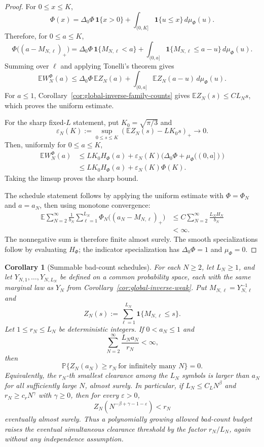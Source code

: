 \documentclass[11pt]{amsart}
\numberwithin{equation}{section}
\newtheorem{corollary}[theorem]{Corollary}
\theoremstyle{definition}
\theoremstyle{remark}
\newcommand{\Prob}{\mathbb P}
\newcommand{\Exp}{\mathbb E}
\newcommand{\eps}{\varepsilon}
\begin{document}
\begin{proof}
For \(0\le x\le K\),
\[
  \Phi(x)=\Delta_0\Phi\,\mathbf1\{x>0\}
  +\int_{(0,K]}\mathbf1\{u\le x\}\,d\mu_\Phi(u).
\]
Therefore, for \(0\le a\le K\),
\[
  \Phi\bigl((a-M_{N,\ell})_+\bigr)
  =
  \Delta_0\Phi\,\mathbf1\{M_{N,\ell}<a\}
  +\int_{(0,a]}\mathbf1\{M_{N,\ell}\le a-u\}\,d\mu_\Phi(u).
\]
Summing over \(\ell\) and applying Tonelli's theorem gives
\[
  \Exp W_N^\Phi(a)
  \le
  \Delta_0\Phi\,\Exp Z_N(a)+
  \int_{(0,a]}\Exp Z_N(a-u)\,d\mu_\Phi(u).
\]
For \(a\le1\), Corollary~\ref{cor:global-inverse-family-counts} gives
\(\Exp Z_N(s)\le CL_Ns\), which proves the uniform estimate.

For the sharp fixed-\(L\) statement, put \(K_0=\sqrt{\pi/3}\) and
\[
  \varepsilon_N(K):=
  \sup_{0\le s\le K}
  \left(\Exp Z_N(s)-LK_0s\right)_+
  \longrightarrow0 .
\]
Then, uniformly for \(0\le a\le K\),
\[
\begin{aligned}
  \Exp W_N^\Phi(a)
  &\le
  LK_0H_\Phi(a)+\varepsilon_N(K)\bigl(\Delta_0\Phi+\mu_\Phi((0,a])\bigr) \\
  &\le
  LK_0H_\Phi(a)+\varepsilon_N(K)\Phi(K).
\end{aligned}
\]
Taking the limsup proves the sharp bound.

The schedule statement follows by applying the uniform estimate with
\(\Phi=\Phi_N\) and \(a=a_N\), then using monotone convergence:
\[
\begin{aligned}
  \Exp\sum_{N=2}^\infty
  \frac{1}{b_N}
  \sum_{\ell=1}^{L_N}\Phi_N\bigl((a_N-M_{N,\ell})_+\bigr)
  &\le
  C\sum_{N=2}^\infty
  \frac{L_NH_N}{b_N}  \\
  &<\infty .
\end{aligned}
\]
The nonnegative sum is therefore finite almost surely.  The smooth
specializations follow by evaluating \(H_\Phi\); the indicator specialization has
\(\Delta_0\Phi=1\) and \(\mu_\Phi=0\).
\end{proof}

\begin{corollary}[Summable bad-count schedules]
\label{cor:global-inverse-family-count-borel}
For each \(N\ge2\), let \(L_N\ge1\), and let
\(Y_{N,1},\ldots,Y_{N,L_N}\) be defined on a common probability space, each with
the same marginal law as \(Y_N\) from
Corollary~\ref{cor:global-inverse-weak}.  Put \(M_{N,\ell}=Y_{N,\ell}^{-1}\) and
\[
  Z_N(s):=\sum_{\ell=1}^{L_N}\mathbf1\{M_{N,\ell}\le s\}.
\]
Let \(1\le r_N\le L_N\) be deterministic integers.  If \(0<a_N\le1\) and
\[
  \sum_{N=2}^\infty \frac{L_Na_N}{r_N}<\infty,
\]
then
\[
  \Prob\{Z_N(a_N)\ge r_N\ \text{for infinitely many }N\}=0.
\]
Equivalently, the \(r_N\)-th smallest clearance among the \(L_N\) symbols is
larger than \(a_N\) for all sufficiently large \(N\), almost surely.  In
particular, if \(L_N\le C_LN^\beta\) and \(r_N\ge c_rN^\gamma\) with
\(\gamma\ge0\), then for every \(\eps>0\),
\[
  Z_N\!\left(N^{-\beta+\gamma-1-\eps}\right)<r_N
\]
eventually almost surely.  Thus a polynomially growing allowed bad-count budget
raises the eventual simultaneous clearance threshold by the factor
\(r_N/L_N\), again without any independence assumption.
\end{corollary}
\end{document}
